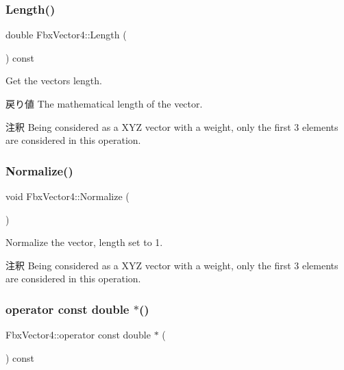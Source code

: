 \subsubsection{\texorpdfstring{Length()}{Length()}}
{\footnotesize\ttfamily double Fbx\+Vector4\+::\+Length (\begin{DoxyParamCaption}{ }\end{DoxyParamCaption}) const}

Get the vector\textquotesingle{}s length. \begin{DoxyReturn}{戻り値}
The mathematical length of the vector. 
\end{DoxyReturn}
\begin{DoxyRemark}{注釈}
Being considered as a X\+YZ vector with a weight, only the first 3 elements are considered in this operation. 
\end{DoxyRemark}
\mbox{\label{class_fbx_vector4_a4eb04e00042eb1b067fabc4c581256ae}} 
\subsubsection{\texorpdfstring{Normalize()}{Normalize()}}
{\footnotesize\ttfamily void Fbx\+Vector4\+::\+Normalize (\begin{DoxyParamCaption}{ }\end{DoxyParamCaption})}

Normalize the vector, length set to 1. \begin{DoxyRemark}{注釈}
Being considered as a X\+YZ vector with a weight, only the first 3 elements are considered in this operation. 
\end{DoxyRemark}
\mbox{\label{class_fbx_vector4_a9be3dde6c582dc5b74f315fa7b6b941f}} 
\subsubsection{\texorpdfstring{operator const double $\ast$()}{operator const double *()}}
{\footnotesize\ttfamily Fbx\+Vector4\+::operator const double $\ast$ (\begin{DoxyParamCaption}{ }\end{DoxyParamCaption}) const}



